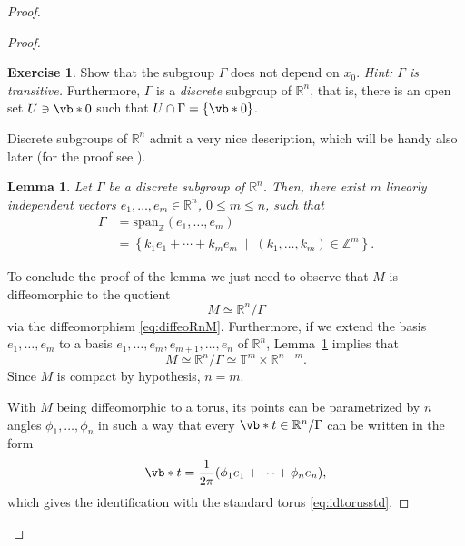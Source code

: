 \documentclass[english,fontsize=11pt,paper=b5]{scrbook}
\numberwithin{equation}{chapter}
\newtheorem{lemma}[theorem]{Lemma}
\theoremstyle{definition}
\newtheorem{exercise}{Exercise}[chapter]
\begin{document}
\begin{proof}
\begin{proof}
          \begin{exercise}
            Show that the subgroup $\Gamma$ does not depend on $x_0$. \textit{Hint: $\Gamma$ is transitive.}
            Furthermore, $\Gamma$ is a \emph{discrete} subgroup of $\mathbb{R}^n$, that is, there is an open set $U \ni \vb* 0$ such that $U\cap\Gamma = \{\vb* 0\}$.
          \end{exercise}

          Discrete subgroups of $\mathbb{R}^n$ admit a very nice description, which will be handy also later (for the proof see \cite[Lemma 13.4]{book:knauf}).

          \begin{lemma}
            \label{lem:reprTm}
            Let $\Gamma$ be a discrete subgroup of $\mathbb{R}^n$. Then, there exist $m$ linearly independent vectors $e_1, \ldots, e_m \in \mathbb{R}^n$, $0\leq m \leq n$, such that
            \begin{align}
              \Gamma & = \mathrm{span}_{\mathbb{Z}}(e_1, \ldots, e_m) \\
                     & = \left\{
                       k_1 e_1 + \cdots + k_m e_m \;\mid\; (k_1, \ldots, k_m)\in\mathbb{Z}^m
                     \right\}.
            \end{align}
          \end{lemma}

          To conclude the proof of the lemma we just need to observe that $M$ is diffeomorphic to the quotient
          \begin{equation}
            M \simeq \mathbb{R}^n / \Gamma
          \end{equation}
          via the diffeomorphism \eqref{eq:diffeoRnM}. Furthermore, if we extend the basis $e_1, \ldots, e_m$ to a basis $e_1, \ldots, e_m, e_{m+1}, \ldots,e_n$ of $\mathbb{R}^n$, Lemma~\ref{lem:reprTm} implies that
          \begin{equation}
            M \simeq \mathbb{R}^n / \Gamma \simeq \mathbb{T}^m \times \mathbb{R}^{n-m}.
          \end{equation}
          Since $M$ is compact by hypothesis, $n=m$.

          With $M$ being diffeomorphic to a torus, its points can be parametrized by $n$ angles $\phi_1, \ldots, \phi_n$ in such a way that every $\vb* t \in \mathbb{R}^n/\Gamma$ can be written in the form
          \begin{equation}
            \vb* t = \frac 1{2\pi}(\phi_1 e_1 + \cdots + \phi_n e_n),
          \end{equation}
          which gives the identification with the standard torus \eqref{eq:idtorusstd}.
        \end{proof}


\end{proof}
\end{document}
